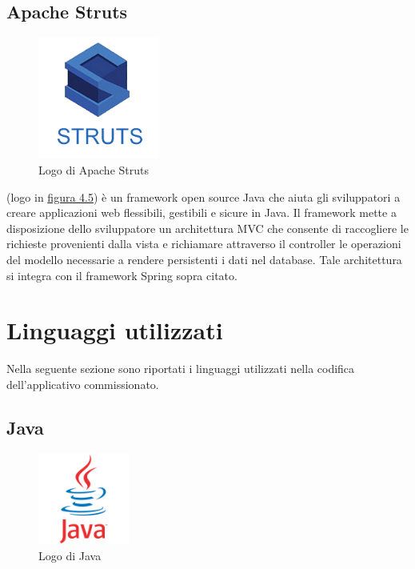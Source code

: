 \pagebreak

\subsection{Apache Struts}

\begin{figure}[!h]
	\centering
	\includegraphics[width=4cm]{../images/Struts-logo.png}
	\caption{Logo di Apache Struts}
	\label{fig:AStruts}
\end{figure}

\ap{{[b]}} (logo in {\hyperref[fig:AStruts]{figura 4.5}}) è un framework open source Java che aiuta gli sviluppatori a creare applicazioni web flessibili, gestibili e sicure in Java. Il framework mette a disposizione dello sviluppatore un architettura MVC che consente di raccogliere le richieste provenienti dalla vista e richiamare attraverso il controller le operazioni del modello necessarie a rendere persistenti i dati nel database. Tale architettura si integra con il framework Spring sopra citato.

\section{Linguaggi utilizzati}
Nella seguente sezione sono riportati i linguaggi utilizzati nella codifica dell'applicativo commissionato.

\subsection{Java}

\begin{figure}[!h]
	\centering
	\includegraphics[width=3cm]{../images/Java-logo.png}
	\caption{Logo di Java}
	\label{fig:java}
\end{figure}

